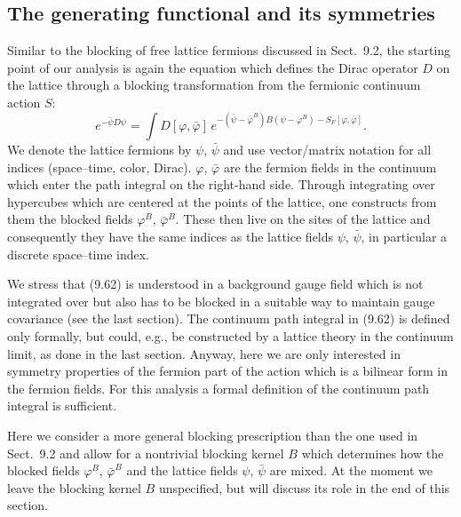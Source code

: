 \subsection{The generating functional and its symmetries}
\label{sec:9.4.1}

Similar to the blocking of free lattice fermions discussed in Sect.~9.2, the
starting point of our analysis is again the equation which defines the Dirac
operator $D$ on the lattice through a blocking transformation from the
fermionic continuum action $S$:
\begin{equation}
  e^{-\bar\psi D\psi} = \int D[\varphi,\bar\varphi]\,
    e^{-(\bar\psi-\bar\varphi^B)B(\psi-\varphi^B) - S_F[\varphi,\bar\varphi]} .
\end{equation}
We denote the lattice fermions by $\psi$, $\bar\psi$ and use vector/matrix
notation for all indices (space--time, color, Dirac). $\varphi$, $\bar\varphi$
are the fermion fields in the continuum which enter the path integral on the
right-hand side. Through integrating over hypercubes which are centered at the
points of the lattice, one constructs from them the blocked fields
$\varphi^B$, $\bar\varphi^B$. These then live on the sites of the lattice and
consequently they have the same indices as the lattice fields $\psi$,
$\bar\psi$, in particular a discrete space--time index.

We stress that (9.62) is understood in a background gauge field which is not
integrated over but also has to be blocked in a suitable way to maintain gauge
covariance (see the last section). The continuum path integral in (9.62) is
defined only formally, but could, e.g., be constructed by a lattice theory in
the continuum limit, as done in the last section. Anyway, here we are only
interested in symmetry properties of the fermion part of the action which is a
bilinear form in the fermion fields. For this analysis a formal definition of
the continuum path integral is sufficient.

Here we consider a more general blocking prescription than the one used in
Sect.~9.2 and allow for a nontrivial blocking kernel $B$ which determines how
the blocked fields $\varphi^B$, $\bar\varphi^B$ and the lattice fields $\psi$,
$\bar\psi$ are mixed. At the moment we leave the blocking kernel $B$
unspecified, but will discuss its role in the end of this section.

